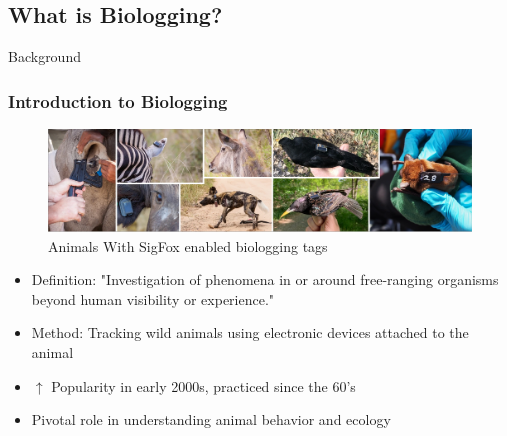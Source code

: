 \documentclass{beamer}
\begin{document}
\subsection{What is Biologging?}
\begin{frame}{Background}
  \frametitle{Introduction to Biologging}
        \begin{figure}[htbp]
          \centering
          \includegraphics[width=.9\textwidth, height=.25\textheight]{TrakingDevices.png}
          \caption{Animals With SigFox enabled biologging tags \cite{wild2023multi}}
          \label{fig:TaggedAnimals}
        \end{figure}
        \begin{itemize}
          \item Definition: "Investigation of phenomena in or around free-ranging organisms beyond human visibility or experience.\cite{boyd2004bio}"
          \item Method: Tracking wild animals using electronic devices attached to the animal
          \item $\uparrow$ Popularity in early 2000s, practiced since the 60's
          \item Pivotal role in understanding animal behavior and ecology
        \end{itemize}
\end{frame}
\end{document}
